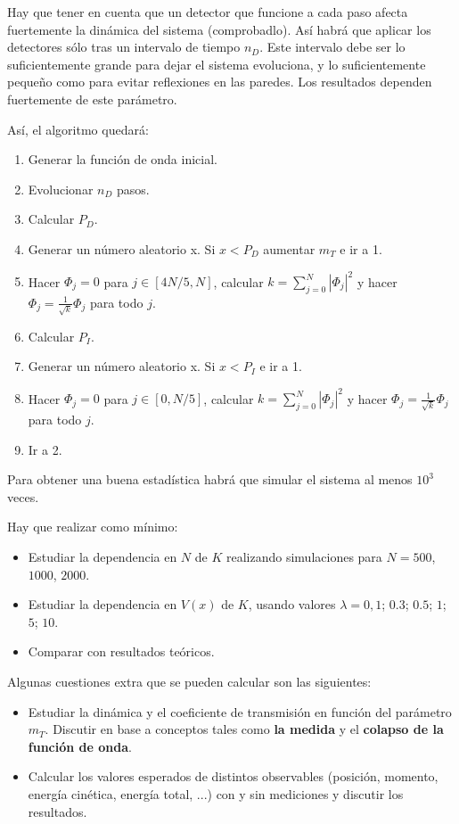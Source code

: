 \documentclass[12pt]{iopart}
\begin{document}
\begin{itemize}
Hay que tener en cuenta que un detector que funcione a cada paso afecta fuertemente la din\'amica del sistema (comprobadlo). As\'i habr\'a que aplicar los detectores s\'olo tras un intervalo de tiempo $n_D$. Este intervalo debe ser lo suficientemente grande para dejar el sistema evoluciona, y lo suficientemente peque\~no como para evitar reflexiones en las paredes. Los resultados dependen fuertemente de este par\'ametro.

As\'i, el algoritmo quedar\'a:

\begin{enumerate}
\item Generar la funci\'on de onda inicial.
\item Evolucionar $n_D$ pasos.
\item Calcular $P_D$.
\item Generar un n\'umero aleatorio x. Si $x<P_D$ aumentar $m_T$ e ir a 1.
\item Hacer  $\Phi_{j}=0$ para $j\in[4N/5,N]$, calcular $k=\sum_{j=0}^N  \left| \Phi_{j}\right|^2$ y hacer $\Phi_{j}=\frac{1}{\sqrt{k}} \Phi_{j}$  para todo $j$.
\item Calcular $P_I$. 
\item Generar un n\'umero aleatorio x. Si $x<P_I$ e ir a 1.
\item Hacer  $\Phi_{j}=0$ para $j\in[0,N/5]$, calcular $k=\sum_{j=0}^N  \left| \Phi_{j}\right|^2$ y hacer $\Phi_{j}=\frac{1}{\sqrt{k}} \Phi_{j}$  para todo $j$.
\item Ir a 2.
\end{enumerate}

Para obtener una buena estad\'istica habr\'a que simular el sistema al menos $10^3$ veces. 

Hay que realizar como m\'inimo: 

\begin{itemize}
\item Estudiar la dependencia en $N$ de $K$ realizando simulaciones para $N=500$, $1000$, $2000$.
\item Estudiar la dependencia en $V(x)$ de $K$, usando valores $\lambda=0, 1$; $0.3$; $0.5$; $1$; $5$; $10$.
\item Comparar con resultados te\'oricos. 
\end{itemize}

Algunas cuestiones extra que se pueden calcular son las siguientes:

\begin{itemize}
\item Estudiar la din\'amica y el coeficiente de transmisi\'on en funci\'on del par\'ametro $m_T$. Discutir en base a conceptos tales como {\bf la medida} y el  {\bf colapso de la funci\'on de onda}.
\newpage
\item Calcular los valores esperados de distintos observables (posici\'on, momento, energ\'ia cin\'etica, energ\'ia total, ...) con y sin mediciones y discutir los resultados.


\end{itemize}
\end{itemize}
\end{document}
